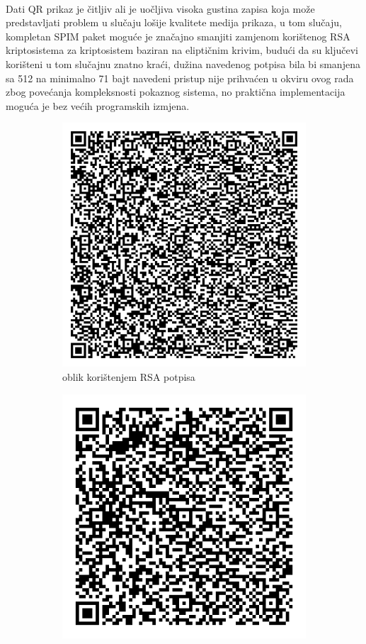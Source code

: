 \paragraph*{}
Dati QR prikaz je čitljiv ali je uočljiva visoka gustina zapisa koja može predstavljati problem u slučaju lošije kvalitete medija prikaza, u tom slučaju, kompletan SPIM paket moguće je značajno smanjiti zamjenom korištenog RSA kriptosistema za kriptosistem baziran na eliptičnim krivim, budući da su ključevi korišteni u tom slučajnu znatno kraći\cite{atmelecc}, dužina navedenog potpisa bila bi smanjena sa 512 na minimalno 71 bajt\cite{cheneau2009ecc} navedeni pristup nije prihvaćen u okviru ovog rada zbog povećanja kompleksnosti pokaznog sistema, no praktična implementacija moguća je bez većih programskih izmjena.

\begin{figure}[H]
    \centering
    \begin{subfigure}{.5\textwidth}
        \centering
        \includegraphics[width=.8\textwidth]{material/logit_qr}
        \caption{oblik korištenjem RSA potpisa}
        \label{img:qr_rsa}
    \end{subfigure}%
    \begin{subfigure}{.5\textwidth}
        \centering
        \includegraphics[width=.8\textwidth]{material/logit_qr_ec}

\end{subfigure}
\end{figure}
